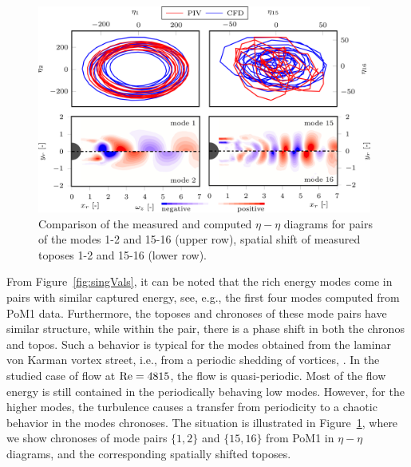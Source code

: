 \begin{figure}[htbp]
    \centering
    \includegraphics[width=0.98\textwidth]{02_images/00_export/figure10.png}
    \caption{Comparison of the measured and computed $\eta-\eta$ diagrams for pairs of the modes 1-2 and 15-16 (upper row), spatial shift of measured toposes 1-2 and 15-16 (lower row).}
    \label{fig:etaVsEta}
\end{figure}

{From} Figure~\ref{fig:singVals}, {it can be noted} that {the} rich energy modes come in pairs with similar captured energy{, see, e.g., the first four modes computed from PoM1 data}. Furthermore, {the} toposes and chronoses {of these mode pairs} have similar structure, while {within} the pair, {there is a phase shift in both the chronos and topos.} {Such a } behavior is typical for the {modes obtained from the} laminar von Karman vortex street, i.e., from a periodic shedding of vortices, . In the studied case {of flow at $\mathrm{Re} = 4815$, the flow is quasi-periodic. Most of the flow energy is still contained in the periodically behaving low modes. However, for the higher modes, the turbulence causes a transfer from periodicity to a chaotic behavior in the modes chronoses. The situation  is illustrated in Figure~\ref{fig:etaVsEta}, where we show chronoses of mode pairs $\{1,2\}$ and $\{15,16\}$ from PoM1 in $\eta-\eta$ diagrams, and the corresponding spatially shifted toposes.}

